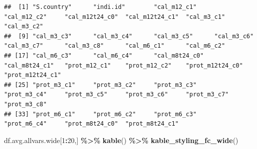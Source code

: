 \documentclass[
]{book}
\newenvironment{Shaded}{\begin{snugshade}}{\end{snugshade}}
\newcommand{\DecValTok}[1]{\textcolor[rgb]{0.00,0.00,0.81}{#1}}
\newcommand{\KeywordTok}[1]{\textcolor[rgb]{0.13,0.29,0.53}{\textbf{#1}}}
\newcommand{\NormalTok}[1]{#1}
\newcommand{\OperatorTok}[1]{\textcolor[rgb]{0.81,0.36,0.00}{\textbf{#1}}}
\newcommand{\StringTok}[1]{\textcolor[rgb]{0.31,0.60,0.02}{#1}}
\begin{document}
\begin{verbatim}
##  [1] "S.country"      "indi.id"        "cal_m12_c1"     "cal_m12_c2"     "cal_m12t24_c0"  "cal_m12t24_c1"  "cal_m3_c1"      "cal_m3_c2"     
##  [9] "cal_m3_c3"      "cal_m3_c4"      "cal_m3_c5"      "cal_m3_c6"      "cal_m3_c7"      "cal_m3_c8"      "cal_m6_c1"      "cal_m6_c2"     
## [17] "cal_m6_c3"      "cal_m6_c4"      "cal_m8t24_c0"   "cal_m8t24_c1"   "prot_m12_c1"    "prot_m12_c2"    "prot_m12t24_c0" "prot_m12t24_c1"
## [25] "prot_m3_c1"     "prot_m3_c2"     "prot_m3_c3"     "prot_m3_c4"     "prot_m3_c5"     "prot_m3_c6"     "prot_m3_c7"     "prot_m3_c8"    
## [33] "prot_m6_c1"     "prot_m6_c2"     "prot_m6_c3"     "prot_m6_c4"     "prot_m8t24_c0"  "prot_m8t24_c1"
\end{verbatim}

\begin{Shaded}
\begin{Highlighting}[]
\NormalTok{df.avg.allvars.wide[}\DecValTok{1}\OperatorTok{:}\DecValTok{20}\NormalTok{,] }\OperatorTok{\%\textgreater{}\%}\StringTok{ }\KeywordTok{kable}\NormalTok{() }\OperatorTok{\%\textgreater{}\%}\StringTok{ }\KeywordTok{kable\_styling\_fc\_wide}\NormalTok{()}
\end{Highlighting}
\end{Shaded}
\end{document}
